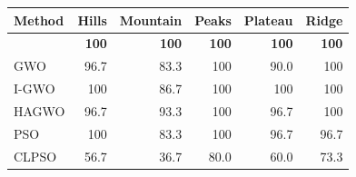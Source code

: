 \begin{tabular}{lrrrrr}
\toprule
Method & Hills & Mountain & Peaks & Plateau & Ridge \\
\midrule
\method{} & \textbf{100} & \textbf{100} & \textbf{100} & \textbf{100} & \textbf{100} \\
GWO & 96.7 & 83.3 & 100 & 90.0 & 100 \\
I-GWO & 100 & 86.7 & 100 & 100 & 100 \\
HAGWO & 96.7 & 93.3 & 100 & 96.7 & 100 \\
PSO & 100 & 83.3 & 100 & 96.7 & 96.7 \\
CLPSO & 56.7 & 36.7 & 80.0 & 60.0 & 73.3 \\
\bottomrule
\end{tabular}
